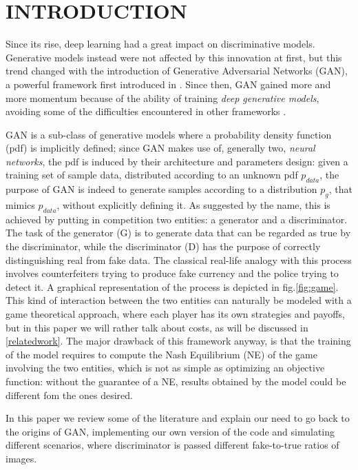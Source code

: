 \section{INTRODUCTION} \label{intro}

Since its rise, deep learning had a great impact on discriminative models. Generative models instead were not affected by this innovation at first, but this trend changed with the introduction of Generative Adversarial Networks (GAN), a powerful framework first introduced in \cite{NIPS2014_5423}. Since then, GAN gained more and more momentum because of the ability of training \textit{deep generative models}, avoiding some of the difficulties encountered in other frameworks \cite{DBLP:journals/corr/Goodfellow17}.

GAN is a sub-class of generative models where a probability density function (pdf) is implicitly defined; since GAN makes use of, generally two, \textit{neural networks}, the pdf is induced by their architecture and parameters design: given a training set of sample data, distributed according to an unknown pdf $p_{data}$, the purpose of GAN is indeed to generate samples according to a distribution $p_g$, that mimics $p_{data}$, without explicitly defining it.
As suggested by the name, this is achieved by putting in competition two entities: a generator and a discriminator. The task of the generator (G) is to generate data that can be regarded as true by the discriminator, while the discriminator (D) has the purpose of correctly distinguishing real from fake data. The classical real-life analogy with this process involves counterfeiters trying to produce fake currency and the police trying to detect it. A graphical representation of the process is depicted in fig.\ref{fig:game}.
This kind of interaction between the two entities can naturally be modeled with a game theoretical approach, where each player has its own strategies and payoffs, but in this paper we will rather talk about costs, as will be discussed in \ref{relatedwork}. The major drawback of this framework anyway, is that the training of the model requires to compute the Nash Equilibrium (NE) of the game involving the two entities, which is not as simple as optimizing an objective function: without the guarantee of a NE, results obtained by the model could be different fom the ones desired.

In this paper we review some of the literature and explain our need to go back to the origins of GAN, implementing our own version of the code and simulating different scenarios, where discriminator is passed different fake-to-true ratios of images.

